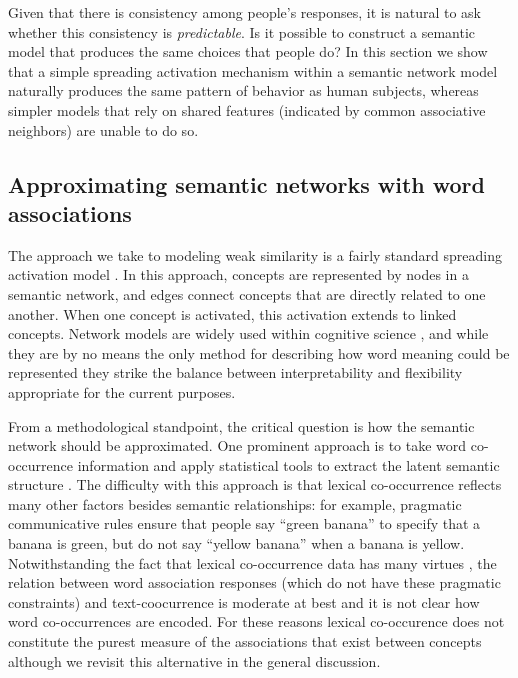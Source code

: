 \documentclass[doc]{apa6}
\begin{document}
Given that there is consistency among people's responses, it is natural to ask whether this consistency is {\it predictable}. Is it possible to construct a semantic model that produces the same choices that people do? In this section we show that a simple spreading activation mechanism within a semantic network model naturally produces the same pattern of behavior as human subjects, whereas simpler models that rely on shared features (indicated by common associative neighbors) are unable to do so.


\subsection{Approximating semantic networks with word associations}

The approach we take to modeling weak similarity is a fairly standard spreading activation model \parencite{Collins1969,Collins1975}. In this approach, concepts are represented by nodes in a semantic network, and edges connect concepts that are directly related to one another. When one concept is activated, this activation extends to linked concepts.
Network models are widely used within cognitive science \parencite{Hutchinson1989,Schvaneveldt1988,Sloman1998b,DeDeyne2008a,DeDeyne2011,Steyvers2005,Hills2009longitudinal,Vitevitch2008,Baronchelli2013}, and while they are by no means the only method for describing how word meaning could be represented \parencite[e.g.,][]{Landauer1997,Griffiths2007,Jones2007,NavarroGriffiths2008,NavarroLee2004,Tversky1977} they strike the balance between interpretability and flexibility appropriate for the current purposes.


From a methodological standpoint, the critical question is how the semantic network should be approximated. One prominent approach is to take word co-occurrence information and apply statistical tools to extract the latent semantic structure \parencite[e.g.,][]{Landauer1997,Griffiths2007}. The difficulty with this approach is that lexical co-occurrence reflects many other factors besides semantic relationships: for example, pragmatic communicative rules ensure that people say ``green banana'' to specify that a banana is green, but do not say ``yellow banana'' when a banana is yellow. Notwithstanding the fact that lexical co-occurrence data has many virtues \parencite{Jones2014}, the relation between word association responses (which do not have these pragmatic constraints) and text-coocurrence is moderate at best \parencite{Szalay1978,DeDeyne2013b} and it is not clear how word co-occurrences are encoded. For these reasons lexical co-occurence does not constitute the purest measure of the associations that exist between concepts although we revisit this alternative in the general discussion.
\end{document}
